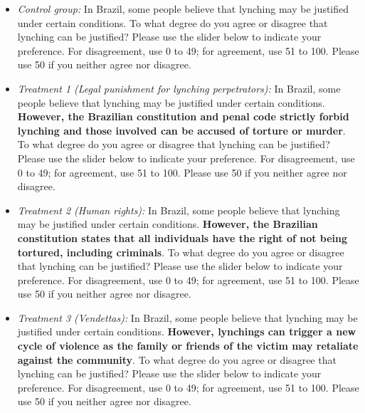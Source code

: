 \documentclass[12pt,a4paper]{article}
\providecommand{\tightlist}{%
   \setlength{\itemsep}{0pt}\setlength{\parskip}{0pt}}
\begin{document}
\begin{itemize}
\tightlist
\item
  \emph{Control group:} In Brazil, some people believe that lynching may be justified under certain conditions. To what degree do you agree or disagree that lynching can be justified? Please use the slider below to indicate your preference. For disagreement, use 0 to 49; for agreement, use 51 to 100. Please use 50 if you neither agree nor disagree.
\end{itemize}

\begin{itemize}
\tightlist
\item
  \emph{Treatment 1 (Legal punishment for lynching perpetrators):} In Brazil, some people believe that lynching may be justified under certain conditions. \textbf{However, the Brazilian constitution and penal code strictly forbid lynching and those involved can be accused of torture or murder}. To what degree do you agree or disagree that lynching can be justified? Please use the slider below to indicate your preference. For disagreement, use 0 to 49; for agreement, use 51 to 100. Please use 50 if you neither agree nor disagree.
\end{itemize}

\begin{itemize}
\tightlist
\item
  \emph{Treatment 2 (Human rights):} In Brazil, some people believe that lynching may be justified under certain conditions. \textbf{However, the Brazilian constitution states that all individuals have the right of not being tortured, including criminals}. To what degree do you agree or disagree that lynching can be justified? Please use the slider below to indicate your preference. For disagreement, use 0 to 49; for agreement, use 51 to 100. Please use 50 if you neither agree nor disagree.
\end{itemize}

\begin{itemize}
\tightlist
\item
  \emph{Treatment 3 (Vendettas):} In Brazil, some people believe that lynching may be justified under certain conditions. \textbf{However, lynchings can trigger a new cycle of violence as the family or friends of the victim may retaliate against the community}. To what degree do you agree or disagree that lynching can be justified? Please use the slider below to indicate your preference. For disagreement, use 0 to 49; for agreement, use 51 to 100. Please use 50 if you neither agree nor disagree.
\end{itemize}
\end{document}
